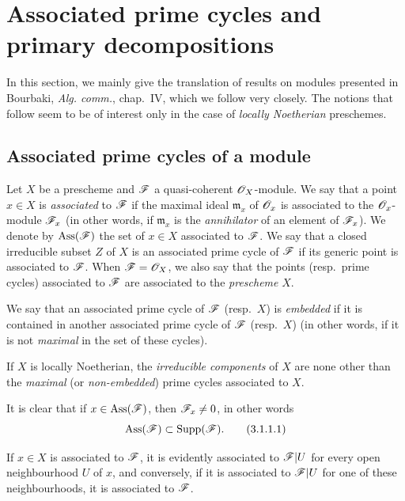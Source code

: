 \section{Associated prime cycles and primary decompositions}
\label{section:IV.3}


In this section, we mainly give the translation of results on modules presented in Bourbaki, \emph{Alg. comm.}, chap.~IV, which we follow very closely.
The notions that follow seem to be of interest only in the case of \emph{locally Noetherian} preschemes.

\subsection{Associated prime cycles of a module}
\label{subsection:IV.3.1}

\begin{definition}[3.1.1]
\label{IV.3.1.1}
Let $X$ be a prescheme and $\mathscr{F}$ a quasi-coherent $\mathscr{O}_X$-module.
We say that a point $x\in X$ is \emph{associated} to $\mathscr{F}$ if the maximal ideal $\mathfrak{m}_x$ of $\mathscr{O}_x$ is associated to the $\mathscr{O}_x$-module $\mathscr{F}_x$ \textup{(in other words, if $\mathfrak{m}_x$ is the \emph{annihilator} of an element of $\mathscr{F}_x$)}.
We denote by $\operatorname{Ass}(\mathscr{F})$ the set of $x\in X$ associated to $\mathscr{F}$.
We say that a closed irreducible subset $Z$ of $X$ is an associated prime cycle of $\mathscr{F}$ if its generic point is associated to $\mathscr{F}$.
When $\mathscr{F}=\mathscr{O}_X$, we also say that the points \textup{(resp.}\ prime cycles) associated to $\mathscr{F}$ are associated to the \emph{prescheme} $X$.
\end{definition}

We say that an associated prime cycle of $\mathscr{F}$ (resp.\ $X$) is \emph{embedded} if it is contained in another associated prime cycle of $\mathscr{F}$ (resp.\ $X$) (in other words, if it is not \emph{maximal} in the set of these cycles).

If $X$ is locally Noetherian, the \emph{irreducible components} of $X$ are none other than the \emph{maximal} (or \emph{non-embedded}) prime cycles associated to $X$.

It is clear that if $x\in\operatorname{Ass}(\mathscr{F})$, then $\mathscr{F}_x\neq 0$, in other words
\[
\label{IV.3.1.1.1}
\operatorname{Ass}(\mathscr{F})\subset\operatorname{Supp}(\mathscr{F}).
\tag{3.1.1.1}
\]

If $x\in X$ is associated to $\mathscr{F}$, it is evidently associated to $\mathscr{F}|U$ for every open neighbourhood $U$ of $x$, and conversely, if it is associated to $\mathscr{F}|U$ for one of these neighbourhoods, it is associated to $\mathscr{F}$.

